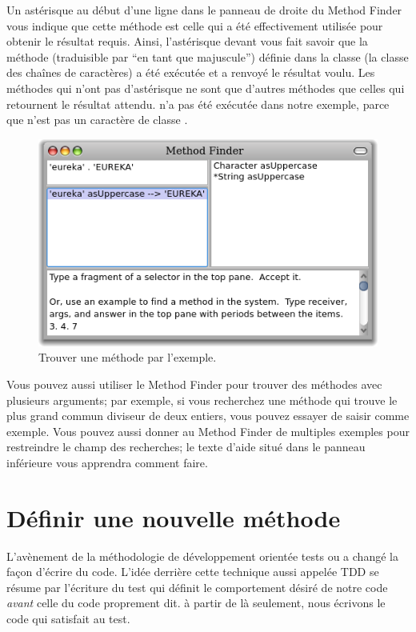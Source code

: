 \documentclass[a4paper,10pt,twoside]{book}
\begin{document}
Un astérisque au début d'une ligne dans le panneau de droite du
Method Finder vous indique que cette méthode est celle qui a été
effectivement utilisée pour obtenir le résultat requis.
Ainsi, l'astérisque devant  vous fait savoir
que la méthode  
(traduisible par ``en tant que majuscule'')
définie dans la classe  
(la classe des chaînes de caractères)
a été exécutée et a renvoyé le résultat voulu.
Les méthodes qui n'ont pas d'astérisque ne sont que d'autres
méthodes que celles qui retournent le résultat attendu.
 n'a pas été exécutée dans notre
exemple, parce que  n'est pas un caractère de classe .

\begin{figure}[hbt]
	{\centerline {\includegraphics[width=\textwidth]{MethodFinder-example1}}}
\caption{Trouver une méthode par l'exemple.
}
\end{figure}

Vous pouvez aussi utiliser le Method Finder pour trouver des
méthodes avec plusieurs arguments; par exemple, si vous recherchez
une méthode qui trouve le plus grand commun diviseur de deux
entiers, vous pouvez essayer de saisir  comme exemple.
Vous pouvez aussi donner au Method Finder de multiples exemples pour
restreindre le champ des recherches; le texte d'aide situé dans le
panneau inférieure vous apprendra comment faire. %

\section{Définir une nouvelle méthode}
L'avènement de la méthodologie de développement orientée tests
ou \cite{Beck03a} a changé la
façon d'écrire du code.
L'idée derrière cette technique aussi appelée TDD se résume par l'écriture
du test qui définit le comportement désiré de notre
code \emph{avant} celle du code proprement dit.
à partir de là seulement, nous écrivons le code qui satisfait au test.
\end{document}
